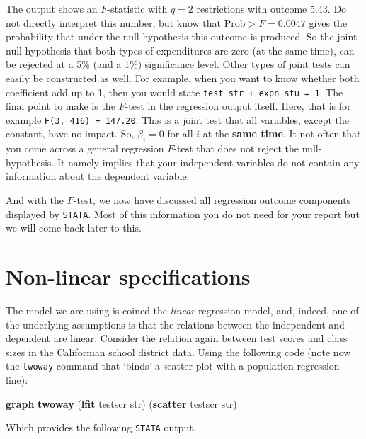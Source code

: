 \documentclass[
]{book}
\newenvironment{Shaded}{\begin{snugshade}}{\end{snugshade}}
\newcommand{\KeywordTok}[1]{\textcolor[rgb]{0.13,0.29,0.53}{\textbf{#1}}}
\newcommand{\NormalTok}[1]{#1}
\begin{document}
The output shows an \(F\)-statistic with \(q=2\) restrictions with outcome 5.43. Do not directly interpret this number, but know that \(\text{Prob} > F = 0.0047\) gives the probability that under the null-hypothesis this outcome is produced. So the joint null-hypothesis that both types of expenditures are zero (at the same time), can be rejected at a 5\% (and a 1\%) significance level. Other types of joint tests can easily be constructed as well. For example, when you want to know whether both coefficient add up to 1, then you would state \texttt{test\ str\ +\ expn\_stu\ =\ 1}. The final point to make is the \(F\)-test in the regression output itself. Here, that is for example \texttt{F(3,\ 416)\ =\ 147.20}. This is a joint test that all variables, except the constant, have no impact. So, \(\beta_i = 0\) for all \(i\) at the \textbf{same time}. It not often that you come across a general regression \(F\)-test that does not reject the null-hypothesis. It namely implies that your independent variables do not contain any information about the dependent variable.

And with the \(F\)-test, we now have discussed all regression outcome components displayed by \texttt{STATA}. Most of this information you do not need for your report but we will come back later to this.

\hypertarget{sec:nonlinear}{%
\section{Non-linear specifications}\label{sec:nonlinear}}

The model we are using is coined the \emph{linear} regression model, and, indeed, one of the underlying assumptions is that the relations between the independent and dependent are linear. Consider the relation again between test scores and class sizes in the Californian school district data. Using the following code (note now the \texttt{twoway} command that `binds' a scatter plot with a population regression line):

\begin{Shaded}
\begin{Highlighting}[]
\KeywordTok{graph} \KeywordTok{twoway}\NormalTok{ (}\KeywordTok{lfit}\NormalTok{ testscr str) (}\KeywordTok{scatter}\NormalTok{ testscr str)}
\end{Highlighting}
\end{Shaded}

Which provides the following \texttt{STATA} output.
\end{document}
